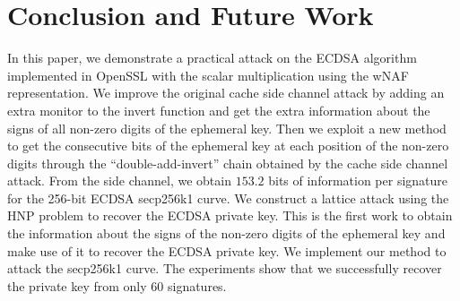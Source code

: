 \section{Conclusion and Future Work}
\label{sec:conclusion}
In this paper, we demonstrate a practical attack on the ECDSA algorithm implemented in OpenSSL with the scalar multiplication using the wNAF representation.
We improve the original cache side channel attack
 by adding an extra monitor to the invert function and get the extra information about the signs of all non-zero digits of the ephemeral key.
Then we exploit a new method to get the consecutive bits of the ephemeral key at each position of the non-zero digits through the ``double-add-invert'' chain obtained by the cache side channel attack.
From the side channel, we obtain $153.2$ bits of information per signature for the 256-bit ECDSA secp256k1 curve.
We construct a lattice attack using the HNP problem to recover the ECDSA private key.
This is the first work to obtain the information about the signs of the non-zero digits of the ephemeral key and make use of it to recover the ECDSA private key.
We implement our method to attack the secp256k1 curve.
The experiments show that we successfully recover the private key from only $60$ signatures.




